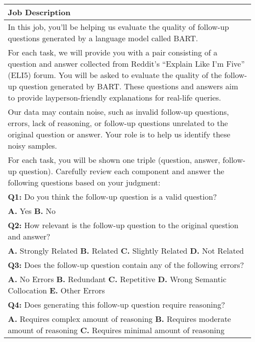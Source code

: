 \begin{table}[H]
    \scriptsize
    \centering
    \begin{tabular}{ p{\columnwidth} }
        \toprule
        \textbf{Job Description} \\
        \midrule
        In this job, you'll be helping us evaluate the quality of follow-up questions generated by a language model called BART. \\
        For each task, we will provide you with a pair consisting of a question and answer collected from Reddit's ``Explain Like I'm Five'' (ELI5) forum. You will be asked to evaluate the quality of the follow-up question generated by BART. These questions and answers aim to provide layperson-friendly explanations for real-life queries. \\
        Our data may contain noise, such as invalid follow-up questions, errors, lack of reasoning, or follow-up questions unrelated to the original question or answer. Your role is to help us identify these noisy samples. \\
        For each task, you will be shown one triple (question, answer, follow-up question). Carefully review each component and answer the following questions based on your judgment: \\
        \midrule
        \textbf{Q1:} Do you think the follow-up question is a valid question? \\
        \textbf{A.} Yes \quad
        \textbf{B.} No \\
        \midrule
        \textbf{Q2:} How relevant is the follow-up question to the original question and answer? \\
        \textbf{A.} Strongly Related \quad
        \textbf{B.} Related \quad
        \textbf{C.} Slightly Related \quad
        \textbf{D.} Not Related \\
        \midrule
        \textbf{Q3:} Does the follow-up question contain any of the following errors? \\
        \textbf{A.} No Errors \quad
        \textbf{B.} Redundant \quad
        \textbf{C.} Repetitive  \quad
        \textbf{D.} Wrong Semantic Collocation \quad
        \textbf{E.} Other Errors \\
        \midrule
        \textbf{Q4:} Does generating this follow-up question require reasoning? \\
        \textbf{A.} Requires complex amount of reasoning \quad
        \textbf{B.} Requires moderate amount of reasoning \quad
        \textbf{C.} Requires minimal amount of reasoning \quad

\end{tabular}
\end{table}
